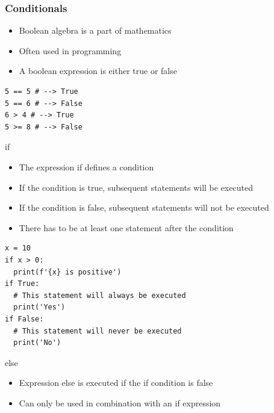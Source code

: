 \documentclass[10pt, a4paper]{beamer} %
\begin{document}
\begin{frame}\frametitle{Conditionals}
  \begin{itemize}
    \item Boolean algebra is a part of mathematics
    \item Often used in programming
    \item A boolean expression is either true or false
  \end{itemize}

  \begin{lstlisting}
5 == 5 # --> True
5 == 6 # --> False
6 > 4 # --> True
5 >= 8 # --> False
\end{lstlisting}

  \framebreak
  {
    \footnotesize

    \begin{examples}

      \begin{block}{\color{mLightBrown}if}

        \begin{itemize}
          \item The expression if defines a condition
          \item If the condition is true, subsequent statements will be executed
          \item If the condition is false, subsequent statements will not be executed
          \item There has to be at least one statement after the condition
        \end{itemize}

      \end{block}
    \end{examples}

    \begin{lstlisting}
x = 10
if x > 0:
  print(f'{x} is positive')
if True:
  # This statement will always be executed
  print('Yes')
if False:
  # This statement will never be executed
  print('No')
\end{lstlisting}
  }
  \framebreak

  \begin{block}{\color{mLightBrown}else}
    \begin{itemize}
      \item Expression else is executed if the if condition is false
      \item Can only be used in combination with an if expression
    \end{itemize}
  \end{block}


\end{frame}
\end{document}
